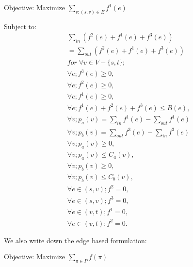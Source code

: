 \documentclass[twoside,leqno, 11pt]{article}
\begin{document}
Objective: Maximize $\sum \limits_{v: (s, v) \in E} f^1(e) $ 

Subject to:
\begin{subequations}
\begin{align}
&\sum\limits_{in} ( f^2(e)+ f^1(e) +f^3(e)) \nonumber\\
&= \sum\limits_{out } ( f^2(e)+ f^1(e)+f^3(e))\\
&for\; \forall v \in V-\{s, t\}; \nonumber\\
&\forall e; f^3(e)\geq 0,\\
&\forall e; f^2(e)\geq 0,\\
&\forall e; f^1(e)\geq 0,\\
&\forall e; f^1(e)+ f^2(e) + f^3(e)\leq B(e),\\
&\forall v; p_a(v) = \sum\limits_{in } f^1(e) - \sum\limits_{out} f^1(e) \\
&\forall v; p_b(v) = \sum\limits_{out } f^3(e) - \sum\limits_{in} f^3(e) \\
&\forall v;p_a(v)\geq 0, \\
&\forall v;p_a(v)\leq C_a(v),\\
&\forall v;p_b(v)\geq 0, \\
&\forall v;p_b(v)\leq C_b(v),\\
&\forall e\in (s,v); f^2=0, \\
&\forall e\in (s,v); f^3=0, \\
&\forall e\in (v,t); f^1=0,\\
&\forall e\in (v,t); f^2=0.
\end{align}
\end{subequations}

We also write down the edge based formulation:

Objective: Maximize  $\sum \limits_{\pi\in P} f(\pi) $
\newline
\end{document}
